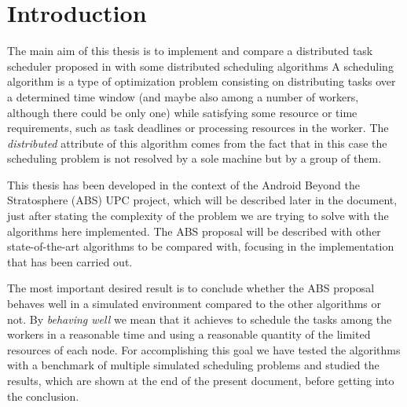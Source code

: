
\chapter{Introduction} %

\label{Chapter1} %


\newcommand{\keyword}[1]{\textbf{#1}}
\newcommand{\tabhead}[1]{\textbf{#1}}
\newcommand{\code}[1]{\texttt{#1}}
\newcommand{\file}[1]{\texttt{\bfseries#1}}
\newcommand{\option}[1]{\texttt{\itshape#1}}

The main aim of this thesis is to implement and compare a distributed task scheduler proposed in \cite{Araguz15} with some distributed scheduling algorithms %
A scheduling algorithm is a type of optimization problem consisting on distributing tasks over a determined time window (and maybe also among a number of workers, although there could be only one) while satisfying some resource or time requirements, such as task deadlines or processing resources in the worker. The \emph{distributed} attribute of this algorithm comes from the fact that in this case the scheduling problem is not resolved by a sole machine but by a group of them.

This thesis has been developed in the context of the Android Beyond the Stratosphere (ABS) UPC project, which will be described later in the document, just after stating the complexity of the problem we are trying to solve with the algorithms here implemented. The ABS proposal will be described with other state-of-the-art algorithms %
 to be compared with, focusing in the implementation that has been carried out. 

The most important desired result is to conclude whether the ABS proposal behaves well in a simulated environment compared to the other algorithms or not.%
By \emph{behaving well} we mean that it achieves to schedule the tasks among the workers in a reasonable time and using a reasonable quantity of the limited resources of each node. For accomplishing this goal we have tested the algorithms with a benchmark of multiple simulated scheduling problems and studied the results, which are shown at the end of the present document, before getting into the conclusion.

